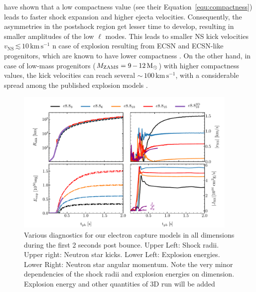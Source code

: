 \documentclass[fleqn,usenatbib]{mnras}
\newcommand{\solm}{\xspace\ensuremath{\rm{M_{\odot}}}\xspace}
\newcommand{\kms}{\ensuremath{\mathrm{km\, s^{-1}}}\xspace}
\newcommand{\NY}[2]{{\color{blue}\sout{#1}#2}}
\newcommand{\COM}[1]{{\color{orange}#1}}
\begin{document}
\citet{Janka2017} have shown that a low compactness value (see their Equation~\ref{equ:compactness}) leads to faster shock expansion and higher ejecta velocities.  Consequently, the asymmetries in the postshock  region get lesser time to develop, resulting in smaller amplitudes of the low $\ell$ modes.  This leads to smaller NS kick velocities $v_{\mathrm{NS}}\, \mathord{\lesssim}\, 10\,\kms$ n case of explosion resulting from ECSN and ECSN-like progenitors, which are known to have lower compactness \citep[Figure~9]{Gessner2018}.
On the other hand, in case of low-mass progenitors ($M_{\mathrm{ZAMS}}=9\, \mathord{-}\, 12\, \solm$) with higher compactness values, the kick velocities can reach several $\mathord{\sim}\, 100 \,\kms$\NY{}{,} with \NY{}{a} considerable spread among the published explosion models \citep{Scheck2006,Mueller2019,Nakamura2019}.
\begin{figure}
 \centering
 \includegraphics[width=0.95\textwidth]{pic/eexp_kick_all_1d2d3d_paper.pdf}
 \caption{Various diagnostics for our electron capture models in all dimensions during the first 2 seconds post bounce. Upper Left: Shock radii. Upper right: Neutron star kicks. Lower Left: Explosion energies. Lower Right: Neutron star angular momentum. Note the very minor dependencies of the shock radii and explosion energies on dimension. \COM{Explosion energy and other quantities of 3D run will be added} }
 \label{fig:e8pzkick}
\end{figure}
\end{document}
